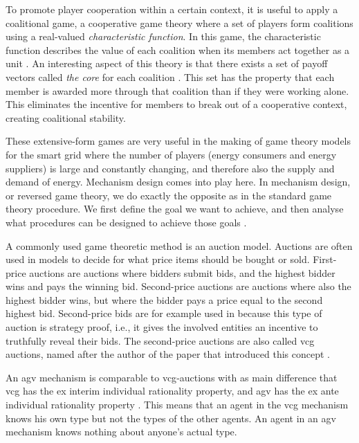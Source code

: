 To promote player cooperation within a certain context, it is useful to apply a coalitional game, a cooperative game theory where a set of players form coalitions using a real-valued \emph{characteristic function}. In this game, the characteristic function describes the value of each coalition when its members act together as a unit \cite{Ferguson2014}. An interesting aspect of this theory is that there exists a set of payoff vectors called \emph{the core} for each coalition \cite{Myerson1991}. This set has the property that each member is awarded more through that coalition than if they were working alone. This eliminates the incentive for members to break out of a cooperative context, creating coalitional stability. 


These extensive-form games are very useful in the making of game theory models for the smart grid where the number of players (energy consumers and energy suppliers) is large and constantly changing, and therefore also the supply and demand of energy. Mechanism design comes into play here. In mechanism design, or reversed game theory, we do exactly the opposite as in the standard game theory procedure. We first define the goal we want to achieve, and then analyse what procedures can be designed to achieve those goals \cite{SalfatiRabinovici2014}. 

A commonly used game theoretic method is an auction model. Auctions are often used in models to decide for what price items should be bought or sold. First-price auctions are auctions where bidders submit bids, and the highest bidder wins and pays the winning bid. Second-price auctions are auctions where also the highest bidder wins, but where the bidder pays a price equal to the second highest bid. Second-price bids are for example used in \cite{SaadHanPoorEtAl2011} because this type of auction is strategy proof, i.e., it gives the involved entities an incentive to truthfully reveal their bids. The second-price auctions are also called \ac{vcg} auctions, named after the author of the paper that introduced this concept \cite{Vickrey1961}.

An \ac{agv} mechanism is comparable to \ac{vcg}-auctions with as main difference that \ac{vcg} has the ex interim individual rationality property, and \ac{agv} has the ex ante individual rationality property \cite{ShohamLeyton-Brown2008}. This means that an agent in the \ac{vcg} mechanism knows his own type but not the types of the other agents. An agent in an \ac{agv} mechanism knows nothing about anyone’s actual type.

